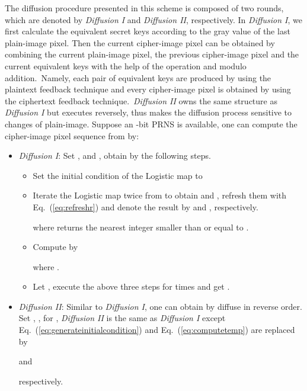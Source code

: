 \documentclass[3p,preprint,11pt]{elsarticle}
\begin{document}
The diffusion procedure presented in this scheme is composed of two rounds,
which are denoted by \textit{Diffusion I} and \textit{Diffusion II}, respectively.
In \textit{Diffusion I}, we first calculate the equivalent secret keys according to the gray value of the last
plain-image pixel. Then the current cipher-image pixel can be obtained by combining the current plain-image pixel, the previous cipher-image pixel and the current equivalent keys with the help of the  operation and modulo  addition.~Namely, each pair of equivalent keys are produced by using the plaintext feedback technique and
every cipher-image pixel is obtained by using the ciphertext feedback technique.~\textit{Diffusion II}
owns the same structure as \textit{Diffusion I} but executes reversely,
thus makes the diffusion process sensitive to changes of plain-image.
Suppose an -bit PRNS  is available, one can compute the cipher-image
pixel sequence  from
 by:
\begin{itemize}
\item \textit{Diffusion I}:
Set ,  and , obtain  by the following steps.
        \begin{itemize}
        \item  Set the initial condition  of the Logistic map to
            

        \item   Iterate the Logistic map twice from  to obtain  and , refresh them        with Eq.~(\ref{eq:refreshr}) and denote the result by  and , respectively.
            
            where  returns the nearest integer smaller than or equal to .
        \item  Compute  by
        
        where .
        \item Let , execute the above three steps for  times and get .
        \end{itemize}

\item \textit{Diffusion II}: Similar to \textit{Diffusion I}, one can obtain  by
diffuse  in reverse order. Set , , for
, \textit{Diffusion II} is the same as \textit{Diffusion I} except Eq.~(\ref{eq:generateinitialcondition}) and
Eq.~(\ref{eq:computetemp}) are replaced by

and

respectively.
\end{itemize}
\end{document}
